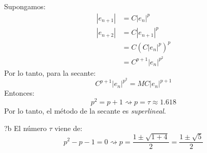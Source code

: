 \documentclass[english, spanish, fleqn, 10pt]{article}
\numberwithin{equation}{section}
\newcommand{\nparentesis}[1]{\left( #1 \right)}
\newcommand{\nabsoluto}[1]{\left| #1 \right|}
\theoremstyle{definition}
\newenvironment{newquote}{\renewcommand{\arraystretch}{1.8}\color[HTML]{009933}\begin{longtable}{?b}}{\end{longtable}\renewcommand{\arraystretch}{1.3}}
\begin{document}
Supongamos:
\begin{align*}
\nabsoluto{e_{n+1}}&=C\nabsoluto{e_n}^p\\
\nabsoluto{e_{n+2}}&=C\nabsoluto{e_{n+1}}^p\\
&=C\nparentesis{C\nabsoluto{e_n}^p}^p\\
&=C^{p+1}\nabsoluto{e_n}^{p^2}
\end{align*}
Por lo tanto, para la secante:
\begin{equation}
C^{p+1}\nabsoluto{e_n}^{p^2}=MC\nabsoluto{e_n}^{p+1}
\end{equation}
Entonces:
\begin{equation}
p^2=p+1\rightsquigarrow p=\tau\approx 1.618
\end{equation}
Por lo tanto, el método de la secante es \textit{superlineal}.

\begin{newquote}
	El número $\tau$ viene de:
	\begin{equation*}
	p^2-p-1=0\rightsquigarrow p=\dfrac{1\pm \sqrt{1+4}}{2}=\dfrac{1\pm \sqrt{5}}{2}
	\end{equation*}	
\end{newquote}
\end{document}

